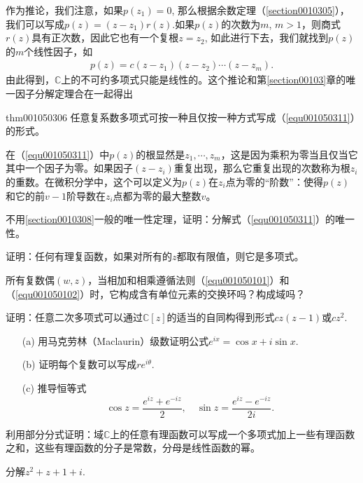 作为推论，我们注意，如果$p(z_1) = 0$, 那么根据余数定理（\ref{section0010305}），我们可以写成$p(z) = (z-z_1)r(z)$.如果$p(z)$的次数为$m$, $m>1$，则商式$r(z)$具有正次数，因此它也有一个复根$z=z_2$, 如此进行下去，我们就找到$p(z)$的$m$个线性因子，如
\begin{gather}\label{equ001050311}
p(z) = c(z-z_1)(z-z_2)\cdots(z-z_m).
\end{gather}
由此得到，$\mathbb{C}$上的不可约多项式只能是线性的。这个推论和第\ref{section00103}章的唯一因子分解定理合在一起得出
\begin{theorem}{}{thm001050306}
任意复系数多项式可按一种且仅按一种方式写成（\ref{equ001050311}）的形式。
\end{theorem}

在（\ref{equ001050311}）中$p(z)$的根显然是$z_1, \cdots, z_m$，这是因为乘积为零当且仅当它其中一个因子为零。如果因子$(z-z_i)$重复出现，那么它重复出现的次数称为根$z_i$的重数。在微积分学中，这个可以定义为$p(z)$在$z_i$点为零的“阶数”：使得$p(z)$和它的前$v-1$阶导数在$z_i$点都为零的最大整数$v$。

\begin{problemset}
\item 不用\ref{section0010308}一般的唯一性定理，证明：分解式（\ref{equ001050311}）的唯一性。

\item 证明：任何有理复函数，如果对所有的$z$都取有限值，则它是多项式。

\item 所有复数偶$(w, z)$，当相加和相乘遵循法则（\ref{equ001050101}）和（\ref{equ001050102}）时，它构成含有单位元素的交换环吗？构成域吗？

\item 证明：任意二次多项式可以通过$\mathbb{C}[z]$的适当的自同构得到形式$cz(z-1)$或$cz^2$.

\item \begin{enumerate}
\item[(a)]用马克劳林（Maclaurin）级数证明公式$e^{ix} = \cos{x} + i\sin{x}$.
\item[(b)]证明每个复数可以写成$re^{i\theta}$.
\item[(c)]推导恒等式
\[
\cos{z} = \frac{e^{iz} + e^{-iz}}{2},\quad\sin{z} = \frac{e^{iz} - e^{-iz}}{2i}.
\]
\end{enumerate}

\item 利用部分分式证明：域$\mathbb{C}$上的任意有理函数可以写成一个多项式加上一些有理函数之和，这些有理函数的分子是常数，分母是线性函数的幂。

\item 分解$z^2+z+1+i$.
\end{problemset}

